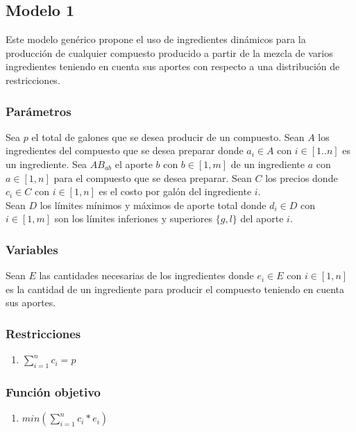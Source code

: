 \documentclass{article}
\begin{document}

\subsection{Modelo 1}
Este modelo genérico propone el uso de ingredientes dinámicos para la producción de cualquier compuesto producido a partir de la mezcla de varios ingredientes teniendo en cuenta sus aportes con respecto a una distribución de restricciones.\\

\subsubsection{Parámetros}
Sea $p$ el total de galones que se desea producir de un compuesto. Sean $A$ los ingredientes del compuesto que se desea preparar donde $a_i \in A$ con $i \in [1..n]$ es un ingrediente. Sea $AB_{ab}$ el aporte $b$ con $b \in [1,m]$ de un ingrediente $a$ con $a \in [1,n]$ para el compuesto que se desea preparar. Sean $C$ los precios donde $c_i \in C$ con $i \in [1,n]$ es el costo por galón del ingrediente $i$.\\

Sean $D$ los límites mínimos y máximos de aporte total donde $d_i \in D$ con $i \in [1,m]$ son los límites inferiones y superiores $\{g,l\}$ del aporte $i$.\\

\subsubsection{Variables}
Sean $E$ las cantidades necesarias de los ingredientes donde $e_i \in E$ con $i \in [1,n]$ es la cantidad de un ingrediente para producir el compuesto teniendo en cuenta sus aportes.\\

\subsubsection{Restricciones}
\begin{enumerate}
    \item $\sum_{i=1}^n c_i= p$
\end{enumerate}

\subsubsection{Función objetivo}
\begin{enumerate}
    \item $min(\sum_{i=1}^n c_i*e_i)$
\end{enumerate}
\end{document}
